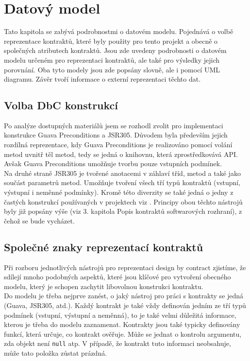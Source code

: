 \chapter{Datový model}
	Tato kapitola se zabývá podrobnostmi o datovém modelu. Pojednává o volbě reprezentace kontraktů, které byly použity pro tento projekt a obecně o společných atributech kontraktů. Jsou zde uvedeny podrobnosti o datovém modelu určeném pro reprezentaci kontraktů, ale také pro výsledky jejich porovnání. Oba tyto modely jsou zde popsány slovně, ale i pomocí UML diagramu. Závěr tvoří informace o externí reprezentaci těchto dat.

	\section{Volba DbC konstrukcí}
		Po analýze dostupných materiálů jsem se rozhodl zvolit pro implementaci konstrukce Guava Preconditions a JSR305. Důvodem byla především jejich rozdílná reprezentace, kdy Guava Preconditions je realizováno pomocí volání metod uvnitř těl metod, tedy se jedná o knihovnu, která zprostředkovává API. Avšak Guava Preconditions umožňuje tvorbu pouze vstupních podmínek.\\
		
		 Na druhé straně JSR305 je tvořené anotacemi v záhlaví tříd, metod a také jako součást parametrů metod. Umožňuje tvoření všech tří typů kontraktů (vstupní, výstupní i neměnné podmínky). Kromě této diverzity se také jedná o jedny z častých konstrukcí používaných v projektech viz \cite{contractsInWild}. Principy obou těchto nástrojů byly již popsány výše (viz 3. kapitola Popis kontraktů softwarových rozhraní), z čehož se bude vycházet.
				
				
	\section{Společné znaky reprezentací kontraktů}		
		Při rozboru jednotlivých nástrojů pro reprezentaci design by contract zjistíme, že sdílejí mnoho podobných aspektů, které jsou klíčové pro vytvoření obecného modelu, který je schopen zachytit libovolnou konstrukci kontraktu.\\ 
		
		Do modelu je třeba nejprve zanést, o jaký nástroj pro práci s kontrakty se jedná (Guava, JSR305, atd.). Každý kontrakt je také vždy definován jedním ze tří typů podmínek (vstupní, výstupní a neměnná), to je také velmi důležitá informace, kterou je třeba do modelu zaznamenat. Kontrakty jsou také typicky definovány funkcí, která určuje, co kontrakt ověřuje. Může se jednat o kontrolu argumentu, zda objekt není \texttt{null} atp. V případě, že kontrakt tuto informaci neobsahuje, může tato položka zůstat prázdná.\\
		

